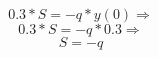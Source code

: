 \begin{equation}
  0.3*S = -q*y(0) \Rightarrow
\end{equation}
\begin{equation}
  0.3*S=-q*0.3 \Rightarrow
\end{equation}
\begin{equation}
  S=-q
\end{equation}
